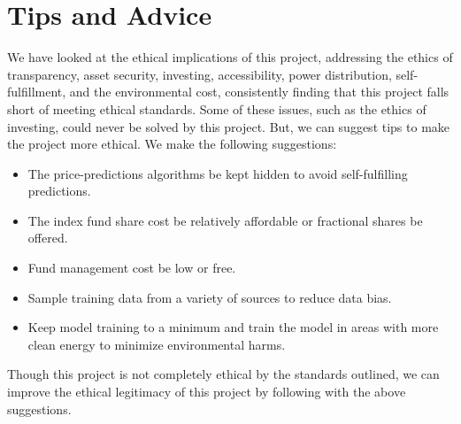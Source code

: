 \documentclass[10pt,twocolumn]{article}
\begin{document}
\section{Tips and Advice}

We have looked at the ethical implications of this project, addressing the ethics of transparency, asset security, investing, accessibility, power distribution, self-fulfillment, and the environmental cost, consistently finding that this project falls short of meeting ethical standards. Some of these issues, such as the ethics of investing, could never be solved by this project. But, we can suggest tips to make the project more ethical. We make the following suggestions:

\begin{itemize}
    \item The price-predictions algorithms be kept hidden to avoid self-fulfilling predictions.
    \item The index fund share cost be relatively affordable or fractional shares be offered.
    \item Fund management cost be low or free.
    \item Sample training data from a variety of sources to reduce data bias.
    \item Keep model training to a minimum and train the model in areas with more clean energy to minimize environmental harms.
\end{itemize}

Though this project is not completely ethical by the standards outlined, we can improve the ethical legitimacy of this project by following with the above suggestions.

\printbibliography 
\end{document}
